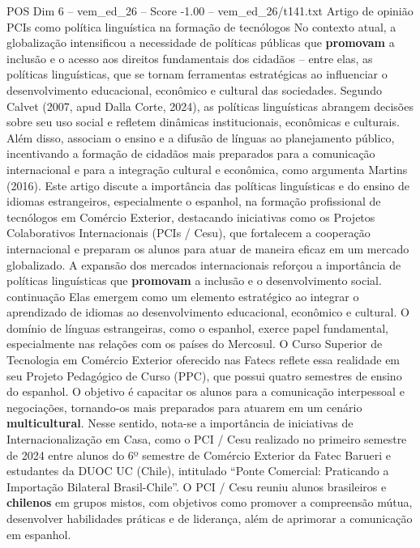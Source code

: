 \begin{textsample}{POS Dim 6 – vem\_ed\_26 – Score -1.00 – vem\_ed\_26/t141.txt}  \label{ex:f6_pos_142}
Artigo de opinião PCIs como política linguística na formação de tecnólogos No contexto atual, a globalização intensificou a necessidade de políticas públicas que \textbf{promovam} a inclusão e o acesso aos direitos fundamentais dos cidadãos – entre elas, as políticas linguísticas, que se tornam ferramentas estratégicas ao influenciar o desenvolvimento educacional, econômico e cultural das sociedades.
Segundo Calvet (2007, apud Dalla Corte, 2024), as políticas linguísticas abrangem decisões sobre seu uso social e refletem dinâmicas institucionais, econômicas e culturais.
Além disso, associam o ensino e a difusão de línguas ao planejamento público, incentivando a formação de cidadãos mais preparados para a comunicação internacional e para a integração cultural e econômica, como argumenta Martins (2016).
Este artigo discute a importância das políticas linguísticas e do ensino de idiomas estrangeiros, especialmente o espanhol, na formação profissional de tecnólogos em Comércio Exterior, destacando iniciativas como os Projetos Colaborativos Internacionais (PCIs / Cesu), que fortalecem a cooperação internacional e preparam os alunos para atuar de maneira eficaz em um mercado globalizado.
A expansão dos mercados internacionais reforçou a importância de políticas linguísticas que \textbf{promovam} a inclusão e o desenvolvimento social. continuação Elas emergem como um elemento estratégico ao integrar o aprendizado de idiomas ao desenvolvimento educacional, econômico e cultural.
O domínio de línguas estrangeiras, como o espanhol, exerce papel fundamental, especialmente nas relações com os países do Mercosul.
O Curso Superior de Tecnologia em Comércio Exterior oferecido nas Fatecs reflete essa realidade em seu Projeto Pedagógico de Curso (PPC), que possui quatro semestres de ensino do espanhol.
O objetivo é capacitar os alunos para a comunicação interpessoal e negociações, tornando-os mais preparados para atuarem em um cenário \textbf{multicultural}.
Nesse sentido, nota-se a importância de iniciativas de Internacionalização em Casa, como o PCI / Cesu realizado no primeiro semestre de 2024 entre alunos do 6º semestre de Comércio Exterior da Fatec Barueri e estudantes da DUOC UC (Chile), intitulado “Ponte Comercial: Praticando a Importação Bilateral Brasil-Chile”.
O PCI / Cesu reuniu alunos brasileiros e \textbf{chilenos} em grupos mistos, com objetivos como promover a compreensão mútua, desenvolver habilidades práticas e de liderança, além de aprimorar a comunicação em espanhol.

\end{textsample}
